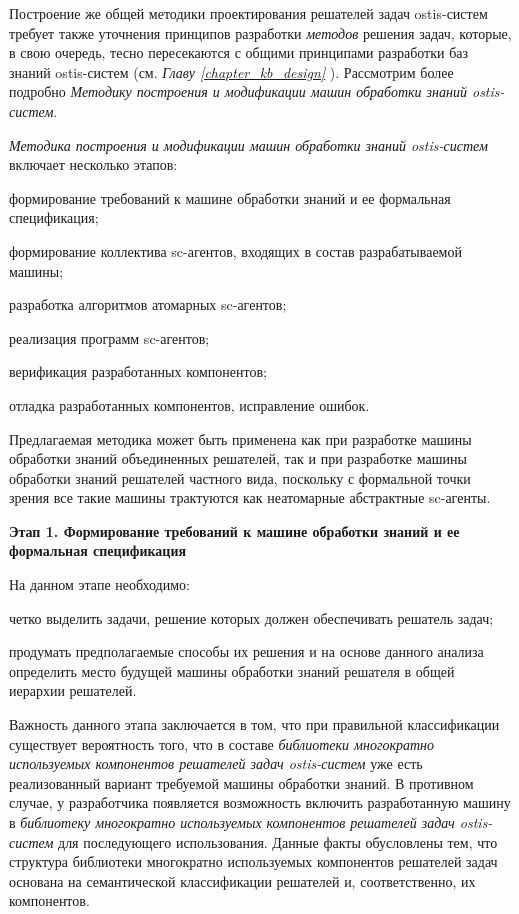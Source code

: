 Построение же общей методики проектирования решателей задач ostis-систем требует также уточнения принципов разработки \textit{методов} решения задач, которые, в свою очередь, тесно пересекаются с общими принципами разработки баз знаний ostis-систем (см. \textit{Главу \ref{chapter_kb_design} }). Рассмотрим более подробно \textit{Методику построения и модификации машин обработки знаний ostis-систем}.

\textit{Методика построения и модификации машин обработки знаний ostis-систем} включает несколько этапов:
\begin{textitemize}
    \item формирование требований к машине обработки знаний и ее формальная спецификация;
    \item формирование коллектива sc-агентов, входящих в состав разрабатываемой машины;
    \item разработка алгоритмов атомарных sc-агентов;
    \item реализация программ sc-агентов;
    \item верификация разработанных компонентов;
    \item отладка разработанных компонентов, исправление ошибок.
\end{textitemize}

Предлагаемая методика может быть применена как при разработке машины обработки знаний объединенных решателей, так и при разработке машины обработки знаний решателей частного вида, поскольку с формальной точки зрения все такие машины трактуются как неатомарные абстрактные sc-агенты.

\textbf{Этап 1. Формирование требований к машине обработки знаний и ее формальная спецификация}

На данном этапе необходимо:
\begin{textitemize}
\item четко выделить задачи, решение которых должен обеспечивать решатель задач;
\item продумать предполагаемые способы их решения и на основе данного анализа определить место будущей машины обработки знаний решателя в общей иерархии решателей.
\end{textitemize}

Важность данного этапа заключается в том, что при правильной классификации существует вероятность того, что в составе \textit{библиотеки многократно используемых компонентов решателей задач ostis-систем} уже есть реализованный вариант требуемой машины обработки знаний. В противном случае, у разработчика появляется возможность включить разработанную машину в \textit{библиотеку многократно используемых компонентов решателей задач ostis-систем} для последующего использования. Данные факты обусловлены тем, что структура библиотеки многократно используемых компонентов решателей задач основана на семантической классификации решателей и, соответственно, их компонентов.

